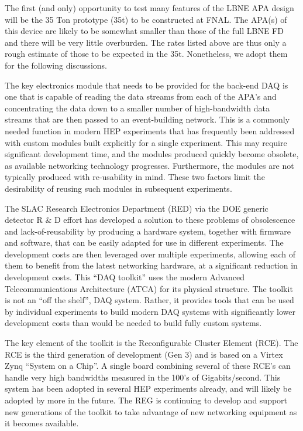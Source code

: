 The first (and only) opportunity to test many features of the LBNE APA 
design will be the 35 Ton prototype (35t) to be constructed at FNAL.
The APA(s) of this device are likely to be somewhat smaller than 
those of the full LBNE FD and there will be very little overburden.
The rates listed above are thus only a rough estimate of those to be
expected in the 35t.
Nonetheless, we adopt them for the following discussions.

The key electronics module that needs to be provided for the back-end DAQ is 
one that is capable of reading the data streams from each of the
APA's and concentrating the data down to a smaller number of high-bandwidth 
data streams that are then passed to an event-building network.
This is a commonly needed function in modern HEP experiments that has frequently 
been addressed with custom modules built explicitly for a single experiment.
This may require significant development time, and the modules produced quickly
become obsolete, as available networking technology progresses.
Furthermore, the modules are not typically produced with re-usability
in mind.
These two factors limit the desirability of reusing such modules in 
subsequent experiments.

The SLAC Research Electronics Department (RED) via the DOE generic detector R \& D effort has developed a solution to these 
problems of obsolescence and lack-of-reusability 
by producing a hardware system, together with firmware and software, that can
be easily adapted for use in different experiments.
The development costs are then leveraged over multiple experiments, allowing 
each of them to benefit from the latest networking hardware, at a significant 
reduction in development costs. 
This ``DAQ toolkit'' uses the modern Advanced Telecommunications Architecture 
(ATCA) for its physical structure.
The toolkit is not an ``off the shelf'', DAQ system.
Rather, it provides tools that can be used by individual experiments to 
build modern DAQ systems with significantly lower development costs than
would be needed to build fully custom systems.

The key element of the toolkit is the Reconfigurable Cluster Element (RCE).
The RCE is the third generation of development (Gen 3) and is
based on a Virtex Zynq ``System on a Chip''.
A single board combining several of these RCE's can handle very high bandwidths 
measured in the 100's of Gigabits/second. 
This system has been adopted in several HEP experiments already, and will likely 
be adopted by more in the future. 
The REG is continuing to develop and support new generations 
of the toolkit to take advantage of new networking equipment as it becomes available.

